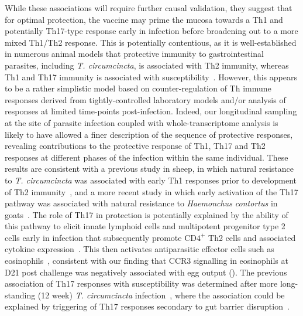 \documentclass[a4paper, hidelinks, 11pt]{article}
\begin{document}
While these associations will require further causal validation, they suggest
that for optimal protection, the vaccine may prime the mucosa towards a Th1 and
potentially Th17-type response early in infection before broadening out to a
more mixed Th1/Th2 response. This is potentially contentious, as it is
well-established in numerous animal models that protective immunity to
gastrointestinal parasites, including \emph{T. circumcincta}, is associated
with Th2 immunity, whereas Th1 and Th17 immunity is associated with
susceptibility~\supercite{Craig2007,Venturina2013,Grencis1997,Maizels2009a,Gossner2012a}.
However, this appears to be a rather simplistic model based on
counter-regulation of Th immune responses derived from tightly-controlled
laboratory models and/or analysis of responses at limited time-points
post-infection. Indeed, our longitudinal sampling at the site of parasite
infection coupled with whole-transcriptome analysis is likely to have allowed a
finer description of the sequence of protective responses, revealing
contributions to the protective response of Th1, Th17 and Th2 responses at
different phases of the infection within the same individual. These results are
consistent with a previous study in sheep, in which natural resistance to
\emph{T. circumcincta} was associated with early Th1 responses prior to
development of Th2 immunity~\supercite{Hassan2011a}, and a more recent study in
which early activation of the Th17 pathway was associated with natural
resistance to \emph{Haemonchus contortus} in goats~\supercite{Aboshady2020}. The
role of Th17 in protection is potentially explained by the ability of this
pathway to elicit innate lymphoid cells and multipotent progenitor type 2 cells
early in infection that subsequently promote CD\(4^+\) Th2 cells and associated
cytokine expression~\supercite{Saenz2010,Saenz2013,Smith2018}. This then activates
antiparasitic effector cells such as
eosinophils~\supercite{Martin2000,Hernandez2020}, consistent with our finding that
CCR3 signalling in eosinophils at D21 post challenge was negatively associated
with egg output (). The previous association of Th17
responses with susceptibility was determined after more long-standing (12 week)
\emph{T. circumcincta} infection~\supercite{Gossner2012a}, where the association
could be explained by triggering of Th17 responses secondary to gut barrier
disruption~\supercite{Kempski2017}.
\end{document}
